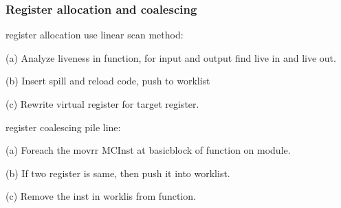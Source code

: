 \subsubsection{Register allocation and coalescing}

register allocation use linear scan method:\par
(a) Analyze liveness in function, for input and output find live in and live out.\par
(b) Insert spill and reload code, push to worklist\par
(c) Rewrite virtual register for target register.

register coalescing pile line:

(a) Foreach the movrr MCInst at basicblock of function on module.\par
(b) If two register is same, then push it into worklist.\par
(c) Remove the inst in worklis from function.\par